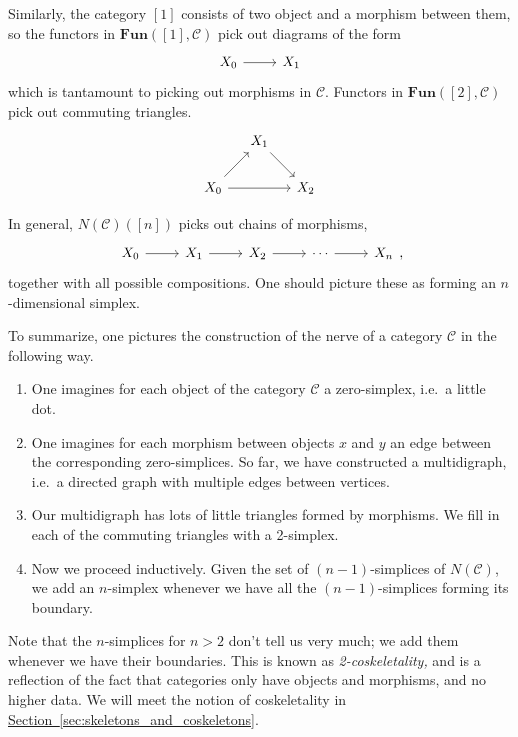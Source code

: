 \documentclass[main.tex]{subfiles}
\begin{document}
Similarly, the category $[1]$ consists of two object and a morphism between them, so the functors in $\mathbf{Fun}([1], \mathcal{C})$ pick out diagrams of the form
\begin{equation*}
  \begin{tikzcd}
    X_{0}
    \arrow[r]
    & X_{1}
  \end{tikzcd}
\end{equation*}
which is tantamount to picking out morphisms in $\mathcal{C}$. Functors in $\mathbf{Fun}([2], \mathcal{C})$ pick out commuting triangles.
\begin{equation*}
  \begin{tikzcd}[column sep=small]
    & X_{1}
    \arrow[dr]
    \\
    X_{0}
    \arrow[rr]
    \arrow[ur]
    && X_{2}
  \end{tikzcd}
\end{equation*}

In general, $N(\mathcal{C})([n])$ picks out chains of morphisms,
\begin{equation*}
  \begin{tikzcd}
    X_{0}
    \arrow[r]
    & X_{1}
    \arrow[r]
    & X_{2}
    \arrow[r]
    & \cdots
    \arrow[r]
    & X_{n}
  \end{tikzcd},
\end{equation*}
together with all possible compositions. One should picture these as forming an $n$-dimensional simplex.

To summarize, one pictures the construction of the nerve of a category $\mathcal{C}$ in the following way.
\begin{enumerate}
  \item One imagines for each object of the category $\mathcal{C}$ a zero-simplex, i.e.\ a little dot.

  \item One imagines for each morphism between objects $x$ and $y$ an edge between the corresponding zero-simplices. So far, we have constructed a multidigraph, i.e.\ a directed graph with multiple edges between vertices.

  \item Our multidigraph has lots of little triangles formed by morphisms. We fill in each of the commuting triangles with a 2-simplex.

  \item Now we proceed inductively. Given the set of $(n-1)$-simplices of $N(\mathcal{C})$, we add an $n$-simplex whenever we have all the $(n-1)$-simplices forming its boundary.
\end{enumerate}
Note that the $n$-simplices for $n > 2$ don't tell us very much; we add them whenever we have their boundaries. This is known as \emph{2-coskeletality,} and is a reflection of the fact that categories only have objects and morphisms, and no higher data. We will meet the notion of coskeletality in \hyperref[sec:skeletons_and_coskeletons]{Section~\ref*{sec:skeletons_and_coskeletons}}.
\end{document}
